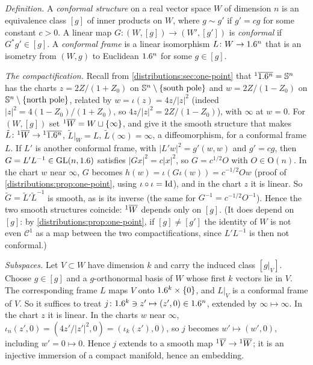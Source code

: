 \subsection*{}
\emph{Definition.} A \emph{conformal structure} on a real vector space $W$ of dimension
$n$ is an equivalence class $[g]$ of inner products on $W$, where $g\sim g'$ if
$g'=cg$ for some constant $c>0$. A linear map $G\colon(W,[g])\to(W',[g'])$ is
\emph{conformal} if $G^*g'\in[g]$. A \emph{conformal frame} is a linear isomorphism
$L\colon W\to1.6^n$ that is an isometry from $(W,g)$ to Euclidean $1.6^n$ for some $g\in[g]$.

\emph{The compactification.} Recall from \cref{distributions:sec:one-point} that
${}^{1}\overline{1.6^n}=\mathbb{S}^n$ has the charts $z=2Z/(1+Z_0)$ on $\mathbb{S}^n\setminus\{\text{south pole}\}$
and $w=2Z/(1-Z_0)$ on $\mathbb{S}^n\setminus\{\text{north pole}\}$, related by $w=\iota(z)=4z/|z|^2$
(indeed $|z|^2=4(1-Z_0)/(1+Z_0)$, so $4z/|z|^2=2Z/(1-Z_0)$), with $\infty$ at $w=0$.
For $(W,[g])$ set ${}^{1}\overline{W}=W\sqcup\{\infty\}$, and give it the smooth structure that
makes $\tilde L\colon{}^{1}\overline{W}\to{}^{1}\overline{1.6^n}$, $\tilde L|_W=L$, $\tilde L(\infty)=\infty$, a
diffeomorphism, for a conformal frame $L$. If $L'$ is another conformal frame, with
$|L'w|^2=g'(w,w)$ and $g'=cg$, then $G=L'L^{-1}\in\operatorname{GL}(n,1.6)$ satisfies
$|Gx|^2=c|x|^2$, so $G=c^{1/2}O$ with $O\in\mathrm{O}(n)$. In the chart $w$ near
$\infty$, $G$ becomes $h(w)=\iota(G\iota(w))=c^{-1/2}Ow$ (proof of
\cref{distributions:prop:one-point}, using $\iota\circ\iota=\operatorname{Id}$), and in the chart $z$ it
is linear. So $\tilde G=\tilde L'\tilde L^{-1}$ is smooth, as is its inverse (the same for
$G^{-1}=c^{-1/2}O^{-1}$). Hence the two smooth structures coincide: ${}^{1}\overline{W}$ depends only
on $[g]$. (It does depend on $[g]$: by \cref{distributions:prop:one-point}, if
$[g]\neq[g']$ the identity of $W$ is not even $\mathcal{C}^1$ as a map between the two
compactifications, since $L'L^{-1}$ is then not conformal.)

\emph{Subspaces.} Let $V\subset W$ have dimension $k$ and carry the induced class
$[g|_V]$. Choose $g\in[g]$ and a $g$-orthonormal basis of $W$ whose first $k$ vectors lie
in $V$. The corresponding frame $L$ maps $V$ onto $1.6^k\times\{0\}$, and $L|_V$ is a
conformal frame of $V$. So it suffices to treat $j\colon1.6^k\ni z'\mapsto(z',0)\in1.6^n$,
extended by $\infty\mapsto\infty$. In the chart $z$ it is linear. In the charts $w$ near
$\infty$, $\iota_n(z',0)=(4z'/|z'|^2,0)=(\iota_k(z'),0)$, so $j$ becomes $w'\mapsto(w',0)$,
including $w'=0\mapsto0$. Hence $j$ extends to a smooth map ${}^{1}\overline{V}\to{}^{1}\overline{W}$; it is an
injective immersion of a compact manifold, hence an embedding.

